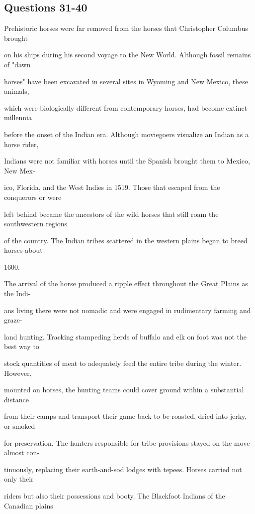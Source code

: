 \documentclass[12pt]{article}
\begin{document}
\subsection*{Questions 31-40}
\begingroup
\small
\sloppy
\setlength{\parskip}{0pt}
\setlength{\parindent}{0pt}
Prehistoric horses were far removed from the horses that Christopher Columbus brought\par
on his ships during his second voyage to the New World. Although fossil remains of "dawn\par
horses" have been excavated in several sites in Wyoming and New Mexico, these animals,\par
which were biologically different from contemporary horses, had become extinct millennia\par
before the onset of the Indian era. Although moviegoers visualize an Indian as a horse rider,\par
Indians were not familiar with horses until the Spanish brought them to Mexico, New Mex-\par
ico, Florida, and the West Indies in 1519. Those that escaped from the conquerors or were\par
left behind became the ancestors of the wild horses that still roam the southwestern regions\par
of the country. The Indian tribes scattered in the western plains began to breed horses about\par
1600.\par
The arrival of the horse produced a ripple effect throughout the Great Plains as the Indi-\par
ans living there were not nomadic and were engaged in rudimentary farming and graze-\par
land hunting. Tracking stampeding herds of buffalo and elk on foot was not the best way to\par
stock quantities of meat to adequately feed the entire tribe during the winter. However,\par
mounted on horses, the hunting teams could cover ground within a substantial distance\par
from their camps and transport their game back to be roasted, dried into jerky, or smoked\par
for preservation. The hunters responsible for tribe provisions stayed on the move almost con-\par
tinuously, replacing their earth-and-sod lodges with tepees. Horses carried not only their\par
riders but also their possessions and booty. The Blackfoot Indians of the Canadian plains\par
\end{document}
